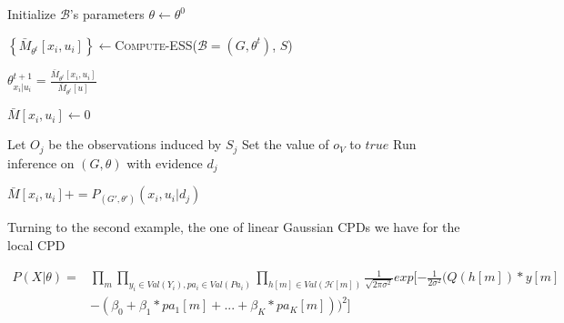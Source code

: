 \documentclass[11pt]{article}
\begin{document}
\begin{article}
\begin{algorithm*}[h!]
\begin{multicols}{2}
\begin{algorithmic}[1]
\State Initialize $\mathcal{B}$'s parameters $\theta \leftarrow \theta^0$

  \State $\left\{ \bar{M}_{\theta^t}[x_{i},u_{i}]\right\} \leftarrow$\textsc{Compute-ESS}($\mathcal{B}=(G,\theta^{t})$, $S$)



      \State $\theta_{x_{i}|u_{i}}^{t+1}=\frac{\bar{M}_{\theta^{t}}[x_{i},u_{i}]}{\bar{M}_{\theta^{t}}[u]}$
    \EndFor
  \EndFor
\EndFor
\EndProcedure
\\

   \State $\bar{M}[x_{i},u_{i}]\leftarrow 0$
  \EndFor
\EndFor


    \State Let $O_j$ be the observations induced by $S_j$
      \State Set the value of $o_V$ to $true$
    \EndFor
    \State Run inference on $(G,\theta)$ with evidence $d_{j}$
    
        \State $\bar{M}[x_{i},u_{i}] \mathrel{{+}{=}} P_{(G',\theta')}(x_{i},u_{i}|d_{j})$
    
      \EndFor
    \EndFor
\EndFor
\EndFunction
\end{algorithmic}
\end{multicols}
\end{algorithm*}


Turning to the second example, the one of linear Gaussian CPDs we
have for the local CPD

\begin{align} \label{eq:like-gaussian-cpd}
P(X|\theta) = &\prod_m \prod_{y_i \in Val(Y_i), pa_i \in Val(Pa_i)} \prod_{h[m] \in Val(\mathscr{H}[m])} \frac{1}{\sqrt{2\pi\sigma^2}} exp[-\frac{1}{2\sigma^2} (Q(h[m]) * y[m]  \\
            & - (\beta_0 + \beta_1 * pa_1[m] + ... + \beta_K * pa_K[m]))^2]  \nonumber
\end{align}


\end{article}
\end{document}
